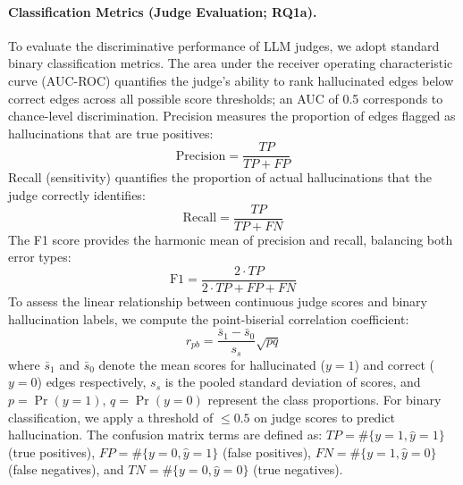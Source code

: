 \paragraph{Classification Metrics (Judge Evaluation; RQ1a).}
To evaluate the discriminative performance of LLM judges, we adopt standard binary classification metrics. The area under the receiver operating characteristic curve (AUC-ROC) quantifies the judge's ability to rank hallucinated edges below correct edges across all possible score thresholds; an AUC of 0.5 corresponds to chance-level discrimination. Precision measures the proportion of edges flagged as hallucinations that are true positives:
\begin{equation}
    \mathrm{Precision} = \frac{TP}{TP + FP}
\end{equation}
Recall (sensitivity) quantifies the proportion of actual hallucinations that the judge correctly identifies:
\begin{equation}
    \mathrm{Recall} = \frac{TP}{TP + FN}
\end{equation}
The F1 score provides the harmonic mean of precision and recall, balancing both error types:
\begin{equation}
    \mathrm{F1} = \frac{2 \cdot TP}{2 \cdot TP + FP + FN}
\end{equation}
To assess the linear relationship between continuous judge scores and binary hallucination labels, we compute the point-biserial correlation coefficient:
\begin{equation}
    r_{pb}=\frac{\bar{s}_1-\bar{s}_0}{s_s}\sqrt{pq}
\end{equation}
where $\bar{s}_1$ and $\bar{s}_0$ denote the mean scores for hallucinated ($y{=}1$) and correct ($y{=}0$) edges respectively, $s_s$ is the pooled standard deviation of scores, and $p=\Pr(y{=}1)$, $q=\Pr(y{=}0)$ represent the class proportions. For binary classification, we apply a threshold of $\leq 0.5$ on judge scores to predict hallucination. The confusion matrix terms are defined as: $TP=\#\{y{=}1,\hat{y}{=}1\}$ (true positives), $FP=\#\{y{=}0,\hat{y}{=}1\}$ (false positives), $FN=\#\{y{=}1,\hat{y}{=}0\}$ (false negatives), and $TN=\#\{y{=}0,\hat{y}{=}0\}$ (true negatives).

